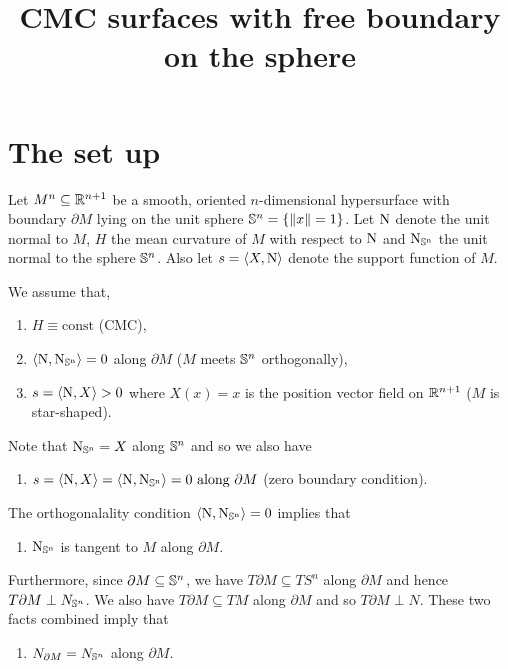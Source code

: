 \documentclass{amsart}
\title[]{CMC surfaces with free boundary on the sphere}
\begin{document}
\begin{abstract}
\end{abstract}

\maketitle

\section{The set up}

Let \(M^n \subseteq \R^{n+1}\) be a smooth, oriented \(n\)-dimensional hypersurface with boundary \(\partial M\) lying on the unit sphere \(\S^n = \{\|x\| = 1\}\). Let \(\nor\) denote the unit normal to \(M\), \(H\) the mean curvature of \(M\) with respect to \(\nor\) and \(\norS\) the unit normal to the sphere \(\S^n\). Also let \(s = \inpr{X}{\nor}\) denote the support function of \(M\).

We assume that,
\begin{enumerate}
\item \(H \equiv \text{const}\) (CMC),
\item \(\inpr{\nor}{\norS} = 0\) along \(\partial M\) (\(M\) meets \(\S^n\) orthogonally),
\item \(s = \inpr{\nor}{X} > 0\) where \(X(x) = x\) is the position vector field on \(\R^{n+1}\) (\(M\) is star-shaped).
\end{enumerate}  
Note that \(\norS = X\) along \(\S^n\) and so we also have
\begin{enumerate}[resume]
\item \(s = \inpr{\nor}{X} = \inpr{\nor}{\norS} = 0 \text{ along } \partial M\) (zero boundary condition).
\end{enumerate}
The orthogonalality condition \(\inpr{\nor}{\norS} = 0\) implies that
\begin{enumerate}[resume]
\item \(\norS\) is tangent to \(M\) along \(\partial M\).
\end{enumerate}
Furthermore, since \(\partial M \subseteq \S^n\), we have \(T\partial M \subseteq TS^n\) along \(\partial M\) and hence \(T\partial M \perp N_{\S^n}\). We also have \(T\partial M \subseteq TM\) along \(\partial M\) and so \(T\partial M \perp N\). These two facts combined imply that
\begin{enumerate}[resume]
\item \(N_{\partial M} = N_{\S^n}\) along \(\partial M\).
\end{enumerate}
\end{document}
